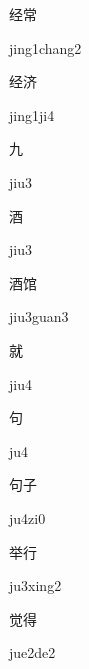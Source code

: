 \begin{multicols*}{2}
\begin{verbete}{经常}
\begin{pronuncia}{jing1chang2}
\end{pronuncia}
\end{verbete}

\begin{verbete}[jing1ji4]{经济}
\begin{pronuncia}{jing1ji4}
\end{pronuncia}
\end{verbete}

\begin{verbete}[jiu3]{九}
\begin{pronuncia}{jiu3}
\end{pronuncia}
\end{verbete}

\begin{verbete}[jiu3]{酒}
\begin{pronuncia}{jiu3}
\end{pronuncia}
\end{verbete}

\begin{verbete}{酒馆}
\begin{pronuncia}{jiu3guan3}
\end{pronuncia}
\end{verbete}

\begin{verbete}[jiu4]{就}
\begin{pronuncia}{jiu4}
\end{pronuncia}
\end{verbete}

\begin{verbete}[ju4]{句}
\begin{pronuncia}{ju4}
\end{pronuncia}
\end{verbete}

\begin{verbete}[ju4zi0]{句子}
\begin{pronuncia}{ju4zi0}
\end{pronuncia}
\end{verbete}

\begin{verbete}[ju3xing2]{举行}
\begin{pronuncia}{ju3xing2}
\end{pronuncia}
\end{verbete}

\begin{verbete}[jue2de2]{觉得}
\begin{pronuncia}{jue2de2}
\end{pronuncia}
\end{verbete}

\end{multicols*}
